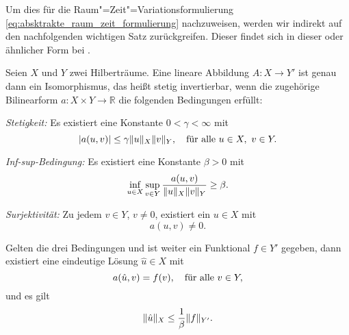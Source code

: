 \documentclass[../main.tex]{subfiles}
\begin{document}
Um dies für die Raum"=Zeit"=Variationsformulierung \cref{eq:absktrakte_raum_zeit_formulierung} nachzuweisen, werden wir indirekt auf den nachfolgenden wichtigen Satz zurückgreifen.
Dieser findet sich in dieser oder ähnlicher Form bei \textcites[Theorem 2.1]{Babuska:1971fx}[Theorem 5.2.1]{Aziz:2014wf}[Theorem \S{}3.3.6]{Braess:2007wm}.

\begin{Satz}
\label{satz:bnb_theorem}
    Seien $X$ und $Y$ zwei Hilberträume.
    Eine lineare Abbildung $A \colon X \to Y'$ ist genau dann ein Isomorphismus, das heißt stetig invertierbar, wenn die zugehörige Bilinearform $a \colon X \times Y \to \mathbb{R}$ die folgenden Bedingungen erfüllt:
    \begin{thmenumerate}
        \item \label{satz:bnb_theorem:stetig}
        \emph{Stetigkeit:}
        Es existiert eine Konstante $0 < \gamma < \infty$ mit
        \begin{equation}
            \abs{a(u, v)} \leq \gamma \norm{u}_{X} \norm{v}_{Y}, \quad \fa u \in X,~v\in Y.
        \end{equation}
        \item \label{satz:bnb_theorem:inf_sup_bedingung}
        \emph{Inf-sup-Bedingung:}
        Es existiert eine Konstante $\beta > 0$ mit
        \begin{equation}
            \inf_{u \in X} \sup_{v \in Y} \frac{a(u, v)}{\norm{u}_{X} \norm{v}_{Y}} \geq \beta.
        \end{equation}
        \item \label{satz:bnb_theorem:surjektiv}
        \emph{Surjektivität:}
        Zu jedem $v \in Y$, $v \neq 0$, existiert ein $u \in X$ mit
        \begin{equation}
            a(u, v) \neq 0.
        \end{equation}
    \end{thmenumerate}
    Gelten die drei Bedingungen und ist weiter ein Funktional $f \in Y'$ gegeben, dann existiert eine eindeutige Lösung $\hat u \in X$ mit
    \begin{equation}
        a(\hat u, v) = f(v), \quad \fa v \in Y,
    \end{equation}
    und es gilt
    \begin{equation}
        \norm{\hat u}_{X} \leq \frac{1}{\beta} \norm{f}_{Y'}.
    \end{equation}
\end{Satz}
\end{document}
